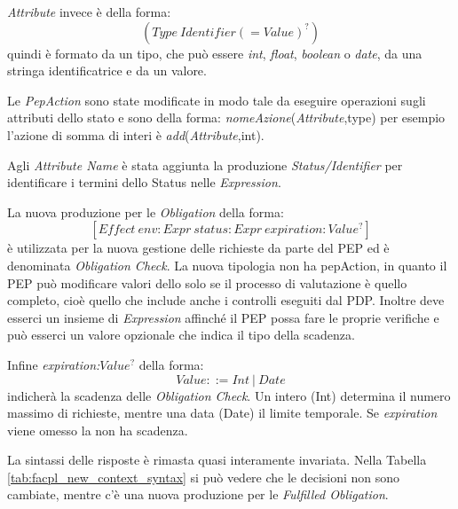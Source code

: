\emph{ Attribute} invece è della forma:
$$(Type\ Identifier (= Value)^?)$$
quindi è formato da un tipo, che può essere \emph{int}, \emph{float}, \emph{boolean} o \emph{date}, da una stringa
identificatrice e da un valore.\par
Le \emph{PepAction} sono state modificate in modo tale da eseguire operazioni sugli attributi dello stato
e sono della forma: \emph{nomeAzione}(\emph{Attribute},type)
per esempio l'azione di somma di interi è \emph{add}(\emph{Attribute},int).\par
Agli \emph{Attribute Name} è stata aggiunta la produzione \textit{Status/Identifier} per identificare i
termini dello Status nelle \emph{Expression}.\par
La nuova produzione per le \emph{Obligation} della forma:
$$[Effect\ env:Expr\  status:Expr \ expiration:Value^?]$$
è utilizzata per la nuova gestione delle richieste da parte del \ac{PEP} ed è denominata \emph{Obligation Check}.
La nuova tipologia non ha pepAction, in quanto il \ac{PEP} può modificare valori dello \status solo se il
processo di valutazione è quello completo, cioè quello che include anche i controlli eseguiti dal \ac{PDP}.
Inoltre deve esserci un insieme di \emph{Expression} affinché il \ac{PEP} possa fare le proprie verifiche
e può esserci un valore opzionale che indica il tipo della scadenza.\par
Infine \emph{expiration:$Value^?$} della forma:
$$Value ::= Int\ |\ Date$$
indicherà la scadenza delle \emph{Obligation Check}. Un intero (Int) determina il numero massimo di richieste, mentre
una data (Date) il limite temporale.
Se \emph{expiration} viene omesso la \eobligation non ha scadenza.
{\label{Sintassi ausiliaria di FACPL Aggiornata}}
{\label{Sintassi di FACPL Aggiornata}}

La sintassi delle risposte è rimasta quasi interamente invariata. Nella Tabella \ref{tab:facpl_new_context_syntax}
si può vedere che le decisioni non sono cambiate, mentre c'è una nuova produzione per le \emph{Fulfilled Obligation}.

